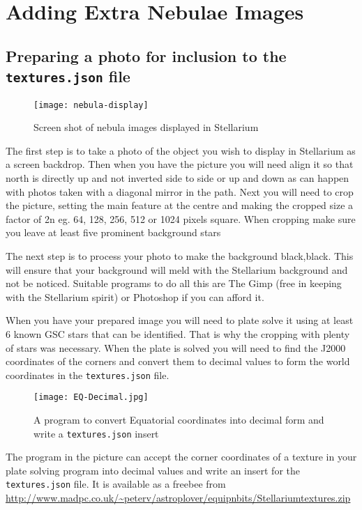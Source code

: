 \section{Adding Extra Nebulae
Images}\label{adding-extra-nebulae-images}

\subsection{\texorpdfstring{Preparing a photo for inclusion to the
\texttt{textures.json}
file}{Preparing a photo for inclusion to the textures.json file}}\label{preparing-a-photo-for-inclusion-to-the-textures.json-file}

\begin{figure}[h]
\centering\texttt{[image: nebula-display]}
\caption{Screen shot of nebula images displayed in Stellarium}
\end{figure}

The first step is to take a photo of the object you wish to display in
Stellarium as a screen backdrop. Then when you have the picture you will
need align it so that north is directly up and not inverted side to side
or up and down as can happen with photos taken with a diagonal mirror in
the path. Next you will need to crop the picture, setting the main
feature at the centre and making the cropped size a factor of 2n eg. 64,
128, 256, 512 or 1024 pixels square. When cropping make sure you leave
at least five prominent background stars

The next step is to process your photo to make the background
black,black. This will ensure that your background will meld with the
Stellarium background and not be noticed. Suitable programs to do all
this are The Gimp (free in keeping with the Stellarium spirit) or
Photoshop if you can afford it.

When you have your prepared image you will need to plate solve it using
at least 6 known GSC stars that can be identified. That is why the
cropping with plenty of stars was necessary. When the plate is solved
you will need to find the J2000 coordinates of the corners and convert
them to decimal values to form the world coordinates in the
\texttt{textures.json} file.

\begin{figure}[h]
\centering\texttt{[image: EQ-Decimal.jpg]}
\caption{A program to convert Equatorial coordinates into decimal
form and write a \texttt{textures.json} insert}
\end{figure}

The program in the picture can accept the corner coordinates of a
texture in your plate solving program into decimal values and write an
insert for the \texttt{textures.json} file. It is available as a freebee
from
\url{http://www.madpc.co.uk/~peterv/astroplover/equipnbits/Stellariumtextures.zip}

